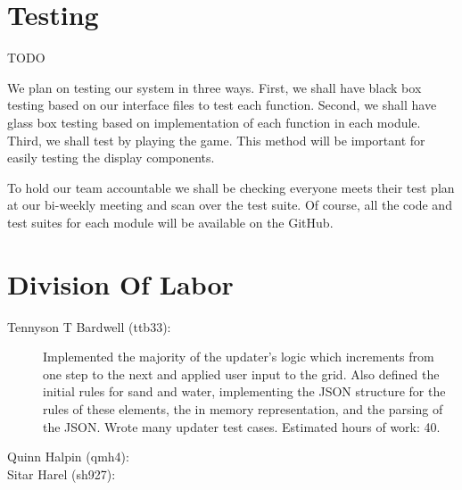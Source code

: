 \section{Testing}
TODO

We plan on testing our system in three ways. First, we shall have black box testing based on our interface files to test each function. Second, we shall have glass box testing based on implementation of each function in each module. Third, we shall test by playing the game. This method will be important for easily testing the display components. 

To hold our team accountable we shall be checking everyone meets their test plan at our bi-weekly meeting and scan over the test suite. Of course, all the code and test suites for each module will be available on the GitHub. 

\section{Division Of Labor}

\begin{description}
  \item[Tennyson T Bardwell (ttb33):]
    Implemented the majority of the updater's logic which increments from one step to the next and applied user input to the grid. Also defined the initial rules for sand and water, implementing the JSON structure for the rules of these elements, the in memory representation, and the parsing of the JSON. Wrote many updater test cases. Estimated hours of work: 40.
  \item[Quinn Halpin (qmh4):]
  \item[Sitar Harel (sh927):]
\end{description}



